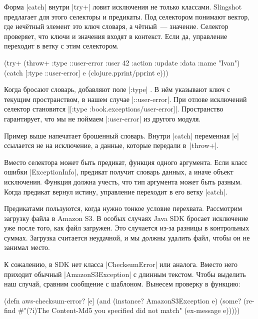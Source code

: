
Форма \spverb|catch| внутри \spverb|try+| ловит исключения не только
классами. Slingshot предлагает для этого селекторы и предикаты. Под селектором
понимают вектор, где неч\"{е}тный элемент это ключ словаря, а ч\"{е}тный~---
значение. Селектор проверяет, что ключи и значения входят в контекст. Если да,
управление переходит в ветку с этим селектором.

\begin{english}
  \begin{clojure/lines}
(try+
 (throw+ {:type ::user-error
          :user 42
          :action :update
          :data {:name "Ivan"}})
 (catch [:type ::user-error] e
   (clojure.pprint/pprint e)))
  \end{clojure/lines}
\end{english}

Когда бросают словарь, добавляют поле \spverb|:type| . В н\"{е}м
указывают ключ с текущим пространством, в нашем случае
\spverb|::user-error|. При отлове исключений селектор становится
\spverb|[:type :book.exceptions/user-error]|. Пространство гарантирует,
что мы не поймаем \spverb|:user-error| из другого модуля.

Пример выше напечатает брошенный словарь. Внутри \spverb|catch| переменная
\spverb|e| ссылается не на исключение, а данные, которые передали
в~\spverb|throw+|.

Вместо селектора может быть предикат, функция одного аргумента. Если класс
ошибки \spverb|ExceptionInfo|, предикат получит словарь данных, а иначе объект
исключения. Функция должна учесть, что тип аргумента может быть разным. Когда
предикат вернул истину, управление переходит в его ветку \spverb|catch|.


Предикатами пользуются, когда нужно тонкое условие перехвата. Рассмотрим
загрузку файла в Amazon S3. В особых случаях Java SDK бросает исключение уже
после того, как файл загружен. Это случается из-за разницы в контрольных
суммах. Загрузка считается неудачной, и мы должны удалить файл, чтобы он не
занимал место.

К сожалению, в SDK нет класса \spverb|ChecksumError| или аналога. Вместо него
приходит обычный \spverb|AmazonS3Exception| с длинным текстом. Чтобы выделить
наш случай, сравним сообщение с шаблоном. Вынесем проверку в функцию:

\begin{english}
  \begin{clojure}
(defn aws-checksum-error? [e]
  (and (instance? AmazonS3Exception e)
       (some?
        (re-find
         #"(?i)The Content-Md5 you specified did not match"
         (ex-message e)))))
  \end{clojure}
\end{english}

